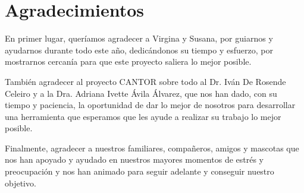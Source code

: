 
\chapter*{Agradecimientos}


En primer lugar, quer\'{i}amos agradecer a Virgina y Susana, por guiarnos y ayudarnos durante todo este a\~{n}o, dedic\'{a}ndonos su tiempo y esfuerzo, por mostrarnos cercan\'{i}a  para que este proyecto saliera lo mejor posible.

Tambi\'{e}n agradecer al proyecto CANTOR sobre todo al Dr. Iv\'{a}n De Rosende Celeiro y a la Dra. Adriana Ivette \'{A}vila \'{A}lvarez, que nos han dado, con su tiempo y paciencia, la oportunidad de dar lo mejor de nosotros para desarrollar una herramienta que esperamos que les ayude a realizar su trabajo lo mejor posible.

Finalmente, agradecer a nuestros familiares, compa\~{n}eros, amigos y mascotas que nos han apoyado y ayudado en nuestros mayores momentos de estr\'{e}s y preocupaci\'{o}n y nos han animado para seguir adelante y conseguir nuestro objetivo.












